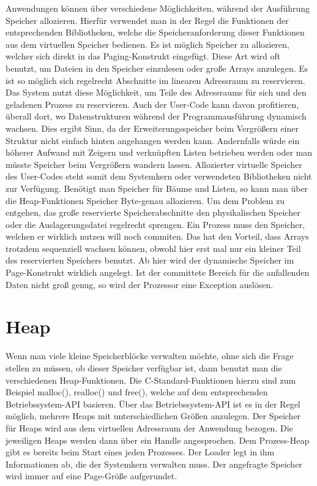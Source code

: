\documentclass[12pt]{book}
\begin{document}
Anwendungen können über verschiedene Möglichkeiten, während der Ausführung
Speicher allozieren. Hierfür verwendet man in der Regel die Funktionen der
entsprechenden Bibliotheken, welche die Speicheranforderung dieser Funktionen
aus dem virtuellen Speicher bedienen. Es ist möglich Speicher zu allozieren,
welcher sich direkt in das Paging-Konstrukt eingefügt. Diese Art wird oft
benutzt, um Dateien in den Speicher einzulesen oder große Arrays anzulegen. Es
ist so möglich sich regelrecht Abschnitte im linearen Adressraum zu reservieren.
Das System nutzt diese Möglichkeit, um Teile des Adressraums für sich und den
geladenen Prozess zu reservieren. Auch der User-Code kann davon profitieren,
überall dort, wo Datenstrukturen während der Programmausführung dynamisch
wachsen. Dies ergibt Sinn, da der Erweiterungsspeicher beim Vergrößern einer
Struktur nicht einfach hinten angehangen werden kann. Andernfalls würde ein
höherer Aufwand mit Zeigern und verknüpften Listen betrieben werden oder man
müsste Speicher beim Vergrößern wandern lassen. Allozierter virtuelle Speicher
des User-Codes steht somit dem Systemkern oder verwendeten Bibliotheken nicht
zur Verfügung. Benötigt man Speicher für Bäume und Listen, so kann man über die
Heap-Funktionen Speicher Byte-genau allozieren. Um dem Problem zu entgehen, das
große reservierte Speicherabschnitte den physikalischen Speicher oder die
Auslagerungsdatei regelrecht sprengen. Ein Prozess muss den Speicher, welchen er
wirklich nutzen will noch commiten. Das hat den Vorteil, dass Arrays trotzdem
sequenziell wachsen können, obwohl hier erst mal nur ein kleiner Teil des
reservierten Speichers benutzt. Ab hier wird der dynamische Speicher im
Page-Konstrukt wirklich angelegt. Ist der committete Bereich für die anfallenden
Daten nicht groß genug, so wird der Prozessor eine Exception auslösen.

\section{Heap}

Wenn man viele kleine Speicherblöcke verwalten möchte, ohne sich die Frage
stellen zu müssen, ob dieser Speicher verfügbar ist, dann benutzt man die
verschiedenen Heap-Funktionen. Die C-Standard-Funktionen hierzu sind zum
Beispiel malloc(), realloc() und free(), welche auf dem entsprechenden
Betriebssystem-API basieren. Über das Betriebssystem-API ist es in der Regel
möglich, mehrere Heaps mit unterschiedlichen Größen anzulegen. Der Speicher für
Heaps wird aus dem virtuellen Adressraum der Anwendung bezogen. Die jeweiligen
Heaps werden dann über ein Handle angesprochen. Dem Prozess-Heap gibt es bereits
beim Start eines jeden Prozesses. Der Loader legt in ihm Informationen ab, die
der Systemkern verwalten muss. Der angefragte Speicher wird immer auf eine
Page-Größe aufgerundet.
\end{document}
